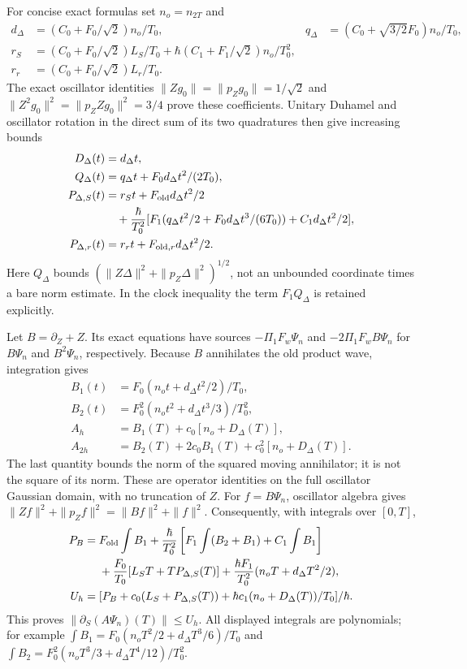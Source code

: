\documentclass[11pt]{article}
\theoremstyle{definition}\newtheorem{definition}[theorem]{Definition}
\theoremstyle{remark}\newtheorem{remark}[theorem]{Remark}
\begin{document}
For concise exact formulas set $n_o=n_{2T}$ and
\begin{align}
 d_\Delta&=(C_0+F_0/\sqrt2)n_o/T_0,&
 q_\Delta&=(C_0+\sqrt{3/2}F_0)n_o/T_0,\\
 r_S&=(C_0+F_0/\sqrt2)L_S/T_0
      +\hbar(C_1+F_1/\sqrt2)n_o/T_0^2,\\
 r_r&=(C_0+F_0/\sqrt2)L_r/T_0. \label{prep:transfer-source}
\end{align}
The exact oscillator identities
$\|Zg_0\|=\|p_Zg_0\|=1/\sqrt2$ and
$\|Z^2g_0\|^2=\|p_ZZg_0\|^2=3/4$ prove these coefficients.
Unitary Duhamel and oscillator rotation in the direct sum of its two
quadratures then give increasing bounds
\begin{align}
 D_\Delta(t)&=d_\Delta t,\\
 Q_\Delta(t)&=q_\Delta t+F_0d_\Delta t^2/(2T_0),\\
 P_{\Delta,S}(t)&=r_St+F_{\rm old}d_\Delta t^2/2\\
 &\quad+\frac\hbar{T_0^2}
  [F_1(q_\Delta t^2/2+F_0d_\Delta t^3/(6T_0))
                     +C_1d_\Delta t^2/2],\\
 P_{\Delta,r}(t)&=r_rt+F_{{\rm old},r}d_\Delta t^2/2.
 \label{prep:transfer-bounds}
\end{align}
Here $Q_\Delta$ bounds
$(\|Z\Delta\|^2+\|p_Z\Delta\|^2)^{1/2}$, not an unbounded
coordinate times a bare norm estimate. In the clock inequality the
term $F_1Q_\Delta$ is retained explicitly.

Let $B=\partial_Z+Z$. Its exact equations have sources
$-\Pi_1F_w\Psi_n$ and $-2\Pi_1F_wB\Psi_n$ for $B\Psi_n$ and
$B^2\Psi_n$, respectively. Because $B$ annihilates the old product
wave, integration gives
\begin{align}
 B_1(t)&=F_0(n_ot+d_\Delta t^2/2)/T_0,\\
 B_2(t)&=F_0^2(n_ot^2+d_\Delta t^3/3)/T_0^2,\\
 A_h&=B_1(T)+c_0[n_o+D_\Delta(T)],\\
 A_{2h}&=B_2(T)+2c_0B_1(T)+c_0^2[n_o+D_\Delta(T)].
 \label{prep:annihilator-handoff}
\end{align}
The last quantity bounds the norm of the squared moving annihilator;
it is not the square of its norm. These are operator identities on the
full oscillator Gaussian domain, with no truncation of $Z$.
For $f=B\Psi_n$, oscillator algebra gives
$\|Zf\|^2+\|p_Zf\|^2=\|Bf\|^2+\|f\|^2$.
Consequently, with integrals over $[0,T]$,
\begin{align*}
 P_B={}&F_{\rm old}\int B_1
 +\frac\hbar{T_0^2}\left[F_1\int(B_2+B_1)+C_1\int B_1\right]\\
 &+\frac{F_0}{T_0}[L_ST+TP_{\Delta,S}(T)]
 +\frac{\hbar F_1}{T_0^2}(n_oT+d_\Delta T^2/2),\\
 U_h={}&[P_B+c_0(L_S+P_{\Delta,S}(T))
           +\hbar c_1(n_o+D_\Delta(T))/T_0]/\hbar.
\end{align*}
This proves $\|\partial_S(A\Psi_n)(T)\|\le U_h$.
All displayed integrals are polynomials; for example
$\int B_1=F_0(n_oT^2/2+d_\Delta T^3/6)/T_0$ and
$\int B_2=F_0^2(n_oT^3/3+d_\Delta T^4/12)/T_0^2$.
\end{document}
